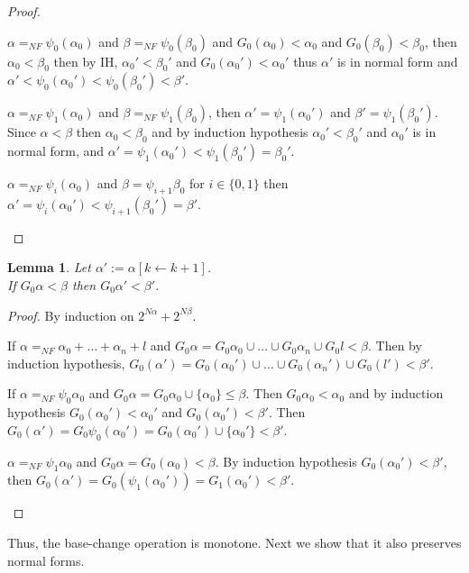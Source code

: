 \documentclass{amsart}
\theoremstyle{plain}
\theoremstyle{plain}
\newtheorem{lemma}[theorem]{Lemma}
\newcommand{\kp}{[k\leftarrow k+1]}
\newcommand{\al}{{\alpha}}
\newcommand{\be}{{\beta}}
\begin{document}
\begin{proof}
\begin{Cases}
    \item $\al =_{NF} \psi_0(\al_0) $ and $\be =_{NF} \psi_0(\be_0)$ and $G_0(\al_0)<\al_0$ and $G_0(\be_0)<\be_0$, 
    then $\al_0 < \be_0$  then by IH, $\al_0'< \be_0'$ and
    $G_0(\al_0') <\al_0'$
    thus $\al'$ is in normal form and $\al'<\psi_0(\al_0') <\psi_0(\be_0' )<\be'$.
    
    \item $\al =_{NF} \psi_1(\al_0) $ and $\be =_{NF} \psi_1(\be_0)$, 
    then $\al' = \psi_1(\al_0')$ and $\be' = \psi_1(\be_0')$.
    Since $\al<\be$ then $\al_0<\be_0$ and by induction hypothesis $\al_0'<\be_0'$ and $\al_0'$ is in normal form, and $\al' = \psi_1(\al_0') < \psi_1(\be_0')= \be_0'$.
    
    \item $\al =_{NF} \psi_i(\al_0)$ and $\be =\psi_{i+1}{\be_0}$ for $i \in \{0,1\}$ then 
    $\al' = \psi_i(\al_0') < \psi_{i+1}(\be_0')= \be'$.
\end{Cases}
\end{proof} 

\begin{lemma} Let $\al' := \al\kp$.\\
If $G_0\al <\be$ then $G_0\al'<\be'$.
\end{lemma}
\begin{proof}
By induction on  $2^{N\al} + 2^{N\be}$.
\begin{Cases}
    \item If $\al=_{NF} \al_0 +\ldots +\al_n +l$ and $G_0\al = G_0\al_0 \cup  \ldots  \cup G_0\al_n \cup G_0l< \be$. 
    Then by induction hypothesis, $G_0(\al') =  G_0(\al_0') \cup \ldots \cup G_0(\al_n') \cup G_0(l')< \be'$.
    
    \item If $\al=_{NF} \psi_0\al_0$ and $G_0\al = G_0\al_0 \cup \{\al_0\} \leq \be$.
    Then $G_0\al_0 <\al_0$ and by induction hypothesis $G_0(\al_0') <\al_0'$ and $G_0(\al_0')<\be'$.
    Then $G_0(\al')= G_0\psi_0(\al_0') = G_0(\al_0') \cup \{\al_0'\} < \be'$.
    
    \item $\al =_{NF} \psi_1\al_0$ and $G_0\al= G_0(\al_0) < \be$. By induction hypothesis $G_0(\al_0')< \be'$, then $G_0(\al') = G_0(\psi_1(\al_0'))= G_1(\al_0') <\be'$.
    
\end{Cases}
\end{proof}
Thus, the base-change operation is monotone. Next we show that it also preserves normal
forms.
\medskip
\end{document}
